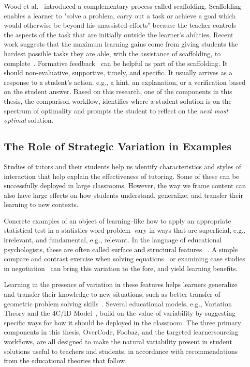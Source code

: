 Wood et al.~\cite{woodscaffolding} introduced a complementary process called scaffolding. Scaffolding enables a learner to "solve a problem, carry out a task or achieve a goal which would otherwise be beyond his unassisted efforts" because the teacher controls the aspects of the task that are initially outside the learner's abilities. Recent work suggests that the maximum learning gains come from giving students the hardest possible tasks they are able, with the assistance of scaffolding, to complete~\cite{zpd14}. Formative feedback~\cite{formative} can be helpful as part of the scaffolding. It should non-evaluative, supportive, timely, and specific. It usually arrives as a response to a student's action, e.g., a hint, an explanation, or a verification based on the student answer. Based on this research, one of the components in this thesis, the comparison workflow, identifies where a student solution is on the spectrum of optimality and prompts the student to reflect on the {\it next most optimal} solution.

\subsection{The Role of Strategic Variation in Examples}

Studies of tutors and their students help us identify characteristics and styles of interaction that help explain the effectiveness of tutoring. Some of these can be successfully deployed in large classrooms. However, the way we frame content can also have large effects on how students understand, generalize, and transfer their learning to new contexts.

Concrete examples of an object of learning--like how to apply an appropriate statistical test in a statistics word problem--vary in ways that are superficial, e.g., irrelevant, and fundamental, e.g., relevant. In the language of educational psychologists, these are often called surface and structural features ~\cite{quilicimayer}. A simple compare and contrast exercise when solving equations~\cite{rittle2007does} or examining case studies in negotiation~\cite{loewenstein2003analogical} can bring this variation to the fore, and yield learning benefits.

Learning in the presence of variation in these features helps learners generalize and transfer their knowledge to new situations, such as better transfer of geometric problem solving skills~\cite{workedexamplesvariability,Variabilityofpractice}. Several educational models, e.g., Variation Theory and the 4C/ID Model~\cite{van2002blueprints}, build on the value of variability by suggesting specific ways for how it should be deployed in the classroom. The three primary components in this thesis, OverCode, Foobaz, and the targeted learnersourcing workflows, are all designed to make the natural variability present in student solutions useful to teachers and students, in accordance with recommendations from the educational theories that follow.

